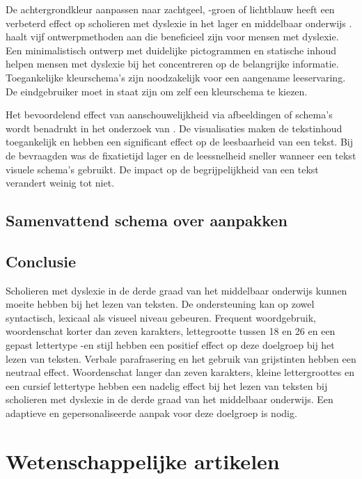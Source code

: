 De achtergrondkleur aanpassen naar zachtgeel, -groen of lichtblauw heeft een verbeterd effect op scholieren met dyslexie in het lager en middelbaar onderwijs \autocite{Bezem2016, Rello2017}. \textcite{Anthony2020} haalt vijf ontwerpmethoden aan die beneficieel zijn voor mensen met dyslexie. Een minimalistisch ontwerp met duidelijke pictogrammen en statische inhoud helpen mensen met dyslexie bij het concentreren op de belangrijke informatie. Toegankelijke kleurschema's zijn noodzakelijk voor een aangename leeservaring. De eindgebruiker moet in staat zijn om zelf een kleurschema te kiezen.

Het bevoordelend effect van aanschouwelijkheid via afbeeldingen of schema's  wordt benadrukt in het onderzoek van \textcite{Rello2012b}. De visualisaties maken de tekstinhoud toegankelijk en hebben een significant effect op de leesbaarheid van een tekst. Bij de bevraagden was de fixatietijd lager en de leessnelheid sneller wanneer een tekst visuele schema's gebruikt. De impact op de begrijpelijkheid van een tekst verandert weinig tot niet.

\subsection{Samenvattend schema over aanpakken}


\subsection{Conclusie}

Scholieren met dyslexie in de derde graad van het middelbaar onderwijs kunnen moeite hebben bij het lezen van teksten. De ondersteuning kan op zowel syntactisch, lexicaal als visueel niveau gebeuren. Frequent woordgebruik, woordenschat korter dan zeven karakters, lettegrootte tussen 18 en 26 en een gepast lettertype -en stijl hebben een positief effect op deze doelgroep bij het lezen van teksten. Verbale parafrasering en het gebruik van grijstinten hebben een neutraal effect. Woordenschat langer dan zeven karakters, kleine lettergroottes en een cursief lettertype hebben een nadelig effect bij het lezen van teksten bij scholieren met dyslexie in de derde graad van het middelbaar onderwijs. Een adaptieve en gepersonaliseerde aanpak voor deze doelgroep is nodig.

\section{Wetenschappelijke artikelen}

